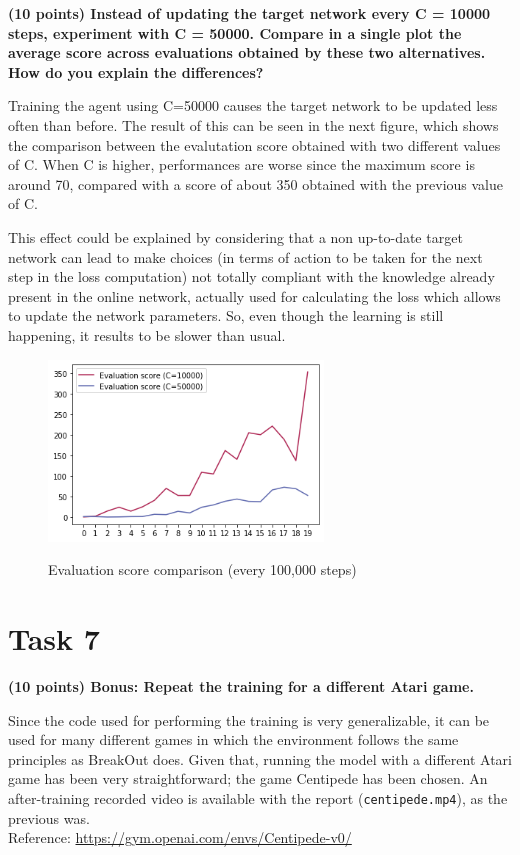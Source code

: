 \documentclass[12pt]{article}
\begin{document}
\textbf{(10 points) Instead of updating the target network every C = 10000 steps, experiment with C = 50000. Compare in a single plot the average score across evaluations obtained by these two alternatives. How do you explain the differences?}

Training the agent using C=50000 causes the target network to be updated less often than before. The result of this can be seen in the next figure, which shows the comparison between the evalutation score obtained with two different values of C. When C is higher, performances are worse since the maximum score is around 70, compared with a score of about 350 obtained with the previous value of C.

This effect could be explained by considering that a non up-to-date target network can lead to make choices (in terms of action to be taken for the next step in the loss computation) not totally compliant with the knowledge already present in the online network, actually used for calculating the loss which allows to update the network parameters. So, even though the learning is still happening, it results to be slower than usual.

\begin{figure}[H]
	\centering
	\includegraphics[width=0.65\textwidth]{images/6_score_eval_comparison.png} 
	\label{fig:c_evalscore_comp}
	\caption{Evaluation score comparison (every 100,000 steps)}
\end{figure}



\section*{Task 7}

\textbf{(10 points) Bonus: Repeat the training for a different Atari game.}

Since the code used for performing the training is very generalizable, it can be used for many different games in which the environment follows the same principles as BreakOut does. Given that, running the model with a different Atari game has been very straightforward; the game Centipede has been chosen. An after-training recorded video is available with the report (\texttt{centipede.mp4}), as the previous was. \\
Reference: \url{https://gym.openai.com/envs/Centipede-v0/}
\end{document}
